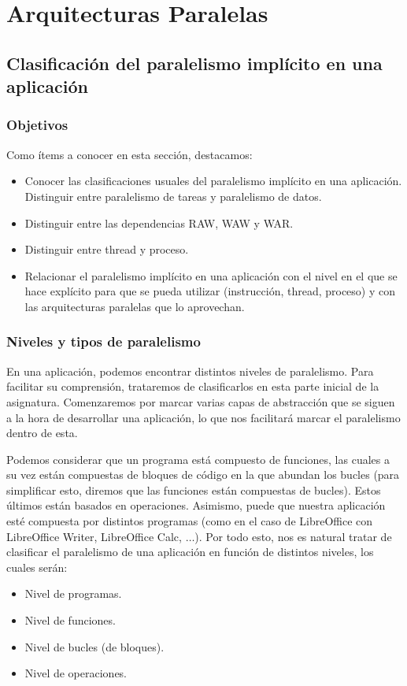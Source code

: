 \chapter{Arquitecturas Paralelas}

\section{Clasificación del paralelismo implícito en una aplicación}
\subsection{Objetivos}
Como ítems a conocer en esta sección, destacamos:
\begin{itemize}
    \item Conocer las clasificaciones usuales del paralelismo implícito en una aplicación. Distinguir entre paralelismo de tareas y paralelismo de datos.
    \item Distinguir entre las dependencias RAW, WAW y WAR.
    \item Distinguir entre thread y proceso.
    \item Relacionar el paralelismo implícito en una aplicación con el nivel en el que se hace explícito para que se pueda utilizar (instrucción, thread, proceso) y con las arquitecturas paralelas que lo aprovechan.
\end{itemize}

\subsection{Niveles y tipos de paralelismo}
En una aplicación, podemos encontrar distintos niveles de paralelismo. Para facilitar su comprensión, trataremos de clasificarlos en esta parte inicial de la asignatura. Comenzaremos por marcar varias capas de abstracción que se siguen a la hora de desarrollar una aplicación, lo que nos facilitará marcar el paralelismo dentro de esta.

Podemos considerar que un programa está compuesto de funciones, las cuales a su vez están compuestas de bloques de código en la que abundan los bucles (para simplificar esto, diremos que las funciones están compuestas de bucles). Estos últimos están basados en operaciones. Asimismo, puede que nuestra aplicación esté compuesta por distintos programas (como en el caso de LibreOffice con LibreOffice Writer, LibreOffice Calc, $\ldots$). Por todo esto, nos es natural tratar de clasificar el paralelismo de una aplicación en función de distintos niveles, los cuales serán:
\begin{itemize}
    \item Nivel de programas.
    \item Nivel de funciones.
    \item Nivel de bucles (de bloques).
    \item Nivel de operaciones.
\end{itemize}

